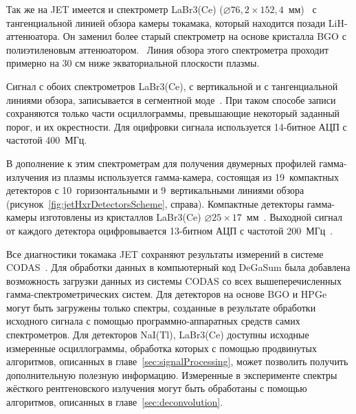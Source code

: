 Так же на JET имеется и спектрометр  LaBr3(Ce) ($\varnothing 76,2 \times 152,4$~мм)~\cite{Nocente2021} с тангенциальной линией обзора камеры токамака, который находится позади LiH-аттенюатора. Он заменил более старый спектрометр на основе кристалла BGO с полиэтиленовым аттенюатором.~\cite{Curuia2017} Линия обзора этого спектрометра проходит примерно на 30 см ниже экваториальной плоскости плазмы. 

Сигнал с обоих спектрометров LaBr3(Ce), с вертикальной и с тангенциальной линиями обзора, записывается в сегментной моде~\cite{Pereira2008,Pereira2011}. При таком способе записи сохраняются только части осциллограммы, превышающие некоторый заданный порог, и их окрестности. Для оцифровки сигнала используется 14-битное АЦП с частотой 400~МГц. 


В дополнение к этим спектрометрам для получения двумерных профилей гамма-излучения из плазмы используется гамма-камера, состоящая из 19~компактных детекторов с 10~горизонтальными и 9~вертикальными линиями обзора (рисунок~\ref{fig:jetHxrDetectorsScheme}, справа). Компактные детекторы гамма-камеры изготовлены из кристаллов LaBr3(Ce) $\varnothing 25 \times 17$~мм~\cite{Rigamonti2018}. Выходной сигнал от каждого детектора оцифровывается 13-битном АЦП с частотой 200~МГц~\cite{Fernandes2018}.

Все диагностики токамака JET сохраняют результаты измерений в системе CODAS~\cite{Jones1986}. Для обработки данных в компьютерный код DeGaSum была добавлена возможность загрузки данных из системы CODAS со всех вышеперечисленных гамма-спектрометрических систем. Для детекторов на основе BGO и HPGe могут быть загружены только спектры, созданные в результате обработки исходного сигнала с помощью программно-аппаратных средств самих спектрометров. Для детекторов NaI(Tl), LaBr3(Ce) доступны исходные измеренные осциллограммы, обработка которых с помощью продвинутых алгоритмов, описанных в главе~\ref{sec:signalProcessing}, может позволить получить дополнительную полезную информацию. Измеренные в эксперименте спектры жёсткого рентгеновского излучения могут быть обработаны с помощью алгоритмов, описанных в главе~\ref{sec:deconvolution}. 


